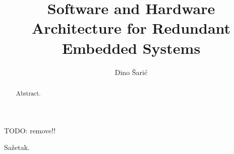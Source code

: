 \documentclass[times, utf8, english, diplomski]{fer}
\begin{document}

\title{Software and Hardware Architecture for Redundant Embedded Systems}

\author{Dino Šarić}

\maketitle

\izvornik


\tableofcontents
\listoffigures

TODO: remove!!\cite{downes2002shortams}







\begin{abstract}
Abstract.

\end{abstract}

\begin{sazetak}
Sažetak.

\end{sazetak}
\end{document}
